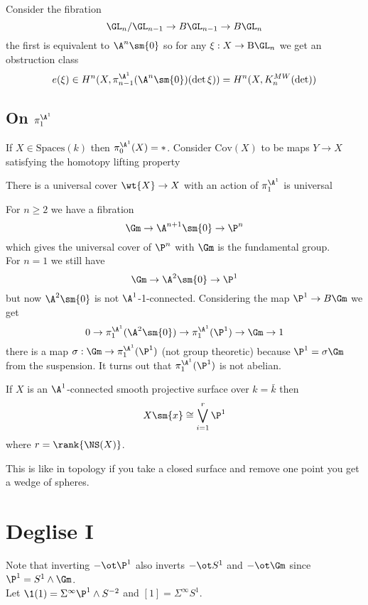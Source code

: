 \documentclass{article}
\begin{document}
\newcommand{\B}{\mathrm{B}}
\newcommand{\Spaces}{\mathrm{Spaces}}
\newcommand{\Cov}{\mathrm{Cov}}


Consider the fibration
\[ \GL_n / \GL_{n-1} \to B \GL_{n-1} \to B \GL_n \]
the first is equivalent to $\A^n \sm \{ 0 \}$ so for any $\xi : X \to \B \GL_n$ we get an obstruction class
\[ e(\xi) \in H^n(X, \pi_{n-1}^{\A^1}(\A^n \sm \{0\})(\det \xi)) = H^n(X, K^{MW}_n(\det)) \]

\subsection{On $\pi_1^{\A^1}$}

If $X \in \Spaces(k)$ then $\pi_0^{\A^1}(X) = *$. Consider $\Cov(X)$ to be maps $Y \to X$ satisfying the homotopy lifting property 



There is a universal cover $\wt{X} \to X$ with an action of $\pi_1^{\A^1}$ is universal

\begin{example}
For $n \ge 2$ we have a fibration
\[ \Gm \to \A^{n+1} \sm \{ 0 \} \to \P^n \]
which gives the universal cover of $\P^n$ with $\Gm$ is the fundamental group.
\bigskip\\
For $n = 1$ we still have
\[ \Gm \to \A^{2} \sm \{ 0 \} \to \P^1 \]
but now $\A^2 \sm \{ 0 \}$ is not $\A^1$-1-connected. Considering the map $\P^1 \to B \Gm$ we get 
\[ 0 \to \pi_1^{\A^1}(\A^2 \sm \{ 0 \}) \to \pi_1^{\A^1}(\P^1) \to \Gm \to 1 \]
there is a map $\sigma : \Gm \to \pi_1^{\A^1}(\P^1)$ (not group theoretic) because $\P^1 = \sigma \Gm$ from the suspension. It turns out that $\pi_1^{\A^1}(\P^1)$ is not abelian.
\end{example}

\begin{theorem}
If $X$ is an $\A^1$-connected smooth projective surface over $k = \bar{k}$ then
\[ X \sm \{ x \} \cong \bigvee_{i = 1}^r \P^1 \]
where $r = \rank{\NS(X)}$.
\end{theorem}

\begin{rmk}
This is like in topology if you take a closed surface and remove one point you get a wedge of spheres. 
\end{rmk}


\section{Deglise I}

Note that inverting $- \ot \P^1$ also inverts $-\ot S^1$ and $- \ot \Gm$ since $\P^1 = S^1 \wedge \Gm$. 
\bigskip\\
Let $\1(1)  = \Sigma^\infty \P^1 \wedge S^{-2}$ and $\![1] = \Sigma^\infty S^1$.
\end{document}

